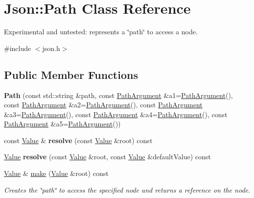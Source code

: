 \hypertarget{class_json_1_1_path}{\section{Json\-:\-:Path Class Reference}
\label{class_json_1_1_path}
}


Experimental and untested\-: represents a \char`\"{}path\char`\"{} to access a node.  




{\ttfamily \#include $<$json.\-h$>$}

\subsection*{Public Member Functions}
\begin{DoxyCompactItemize}
\item 
\hypertarget{class_json_1_1_path_aaa37a99650e770d0cd680bf53585ec99}{{\bfseries Path} (const std\-::string \&path, const \hyperlink{class_json_1_1_path_argument}{Path\-Argument} \&a1=\hyperlink{class_json_1_1_path_argument}{Path\-Argument}(), const \hyperlink{class_json_1_1_path_argument}{Path\-Argument} \&a2=\hyperlink{class_json_1_1_path_argument}{Path\-Argument}(), const \hyperlink{class_json_1_1_path_argument}{Path\-Argument} \&a3=\hyperlink{class_json_1_1_path_argument}{Path\-Argument}(), const \hyperlink{class_json_1_1_path_argument}{Path\-Argument} \&a4=\hyperlink{class_json_1_1_path_argument}{Path\-Argument}(), const \hyperlink{class_json_1_1_path_argument}{Path\-Argument} \&a5=\hyperlink{class_json_1_1_path_argument}{Path\-Argument}())}\label{class_json_1_1_path_aaa37a99650e770d0cd680bf53585ec99}

\item 
\hypertarget{class_json_1_1_path_ae1d05fa985a6ee3c57f2b8ed186b5982}{const \hyperlink{class_json_1_1_value}{Value} \& {\bfseries resolve} (const \hyperlink{class_json_1_1_value}{Value} \&root) const }\label{class_json_1_1_path_ae1d05fa985a6ee3c57f2b8ed186b5982}

\item 
\hypertarget{class_json_1_1_path_a33d1749770a4cf74e9a3de419bc7febe}{\hyperlink{class_json_1_1_value}{Value} {\bfseries resolve} (const \hyperlink{class_json_1_1_value}{Value} \&root, const \hyperlink{class_json_1_1_value}{Value} \&default\-Value) const }\label{class_json_1_1_path_a33d1749770a4cf74e9a3de419bc7febe}

\item 
\hypertarget{class_json_1_1_path_a5289901fc58ad1fdca1de7fb5a0b620c}{\hyperlink{class_json_1_1_value}{Value} \& \hyperlink{class_json_1_1_path_a5289901fc58ad1fdca1de7fb5a0b620c}{make} (\hyperlink{class_json_1_1_value}{Value} \&root) const }\label{class_json_1_1_path_a5289901fc58ad1fdca1de7fb5a0b620c}

\begin{DoxyCompactList}\small\item\em Creates the \char`\"{}path\char`\"{} to access the specified node and returns a reference on the node. \end{DoxyCompactList}\end{DoxyCompactItemize}


